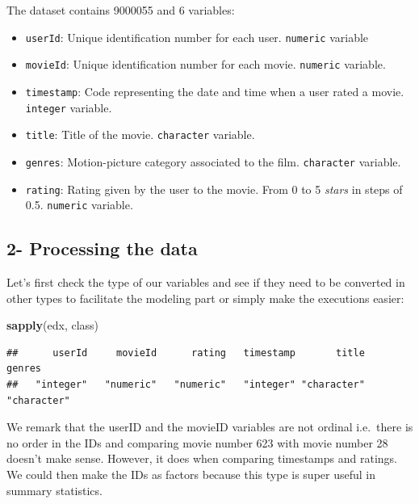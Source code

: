 \documentclass[]{article}
\newenvironment{Shaded}{\begin{snugshade}}{\end{snugshade}}
\newcommand{\KeywordTok}[1]{\textcolor[rgb]{0.13,0.29,0.53}{\textbf{#1}}}
\newcommand{\NormalTok}[1]{#1}
\providecommand{\tightlist}{%
  \setlength{\itemsep}{0pt}\setlength{\parskip}{0pt}}
\begin{document}
The dataset contains 9000055 and 6 variables:

\begin{itemize}
\tightlist
\item
  \texttt{userId}: Unique identification number for each user.
  \texttt{numeric} variable\\
\item
  \texttt{movieId}: Unique identification number for each movie.
  \texttt{numeric} variable.\\
\item
  \texttt{timestamp}: Code representing the date and time when a user
  rated a movie. \texttt{integer} variable.\\
\item
  \texttt{title}: Title of the movie. \texttt{character} variable.\\
\item
  \texttt{genres}: Motion-picture category associated to the film.
  \texttt{character} variable.\\
\item
  \texttt{rating}: Rating given by the user to the movie. From 0 to 5
  \emph{stars} in steps of 0.5. \texttt{numeric} variable.
\end{itemize}

\subsection{2- Processing the data}\label{processing-the-data}

Let's first check the type of our variables and see if they need to be
converted in other types to facilitate the modeling part or simply make
the executions easier:

\begin{Shaded}
\begin{Highlighting}[]
\KeywordTok{sapply}\NormalTok{(edx, class)}
\end{Highlighting}
\end{Shaded}

\begin{verbatim}
##      userId     movieId      rating   timestamp       title      genres 
##   "integer"   "numeric"   "numeric"   "integer" "character" "character"
\end{verbatim}

We remark that the userID and the movieID variables are not ordinal
i.e.~there is no order in the IDs and comparing movie number 623 with
movie number 28 doesn't make sense. However, it does when comparing
timestamps and ratings. We could then make the IDs as factors because
this type is super useful in summary statistics.
\end{document}
